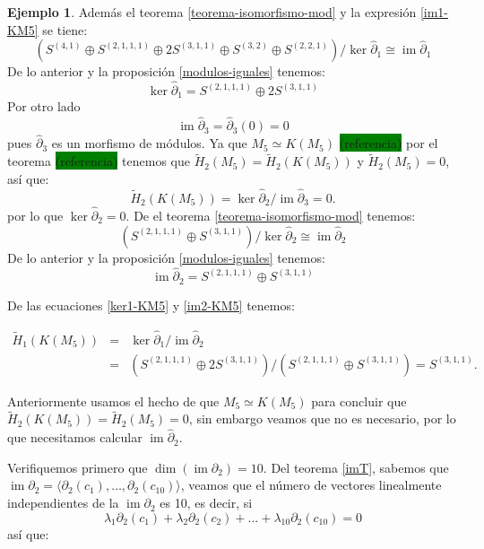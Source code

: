 \documentclass[12pt]{book}
\theoremstyle{definition}
\newtheorem{example}[theorem]{Ejemplo}
\DeclareMathOperator{\im}{im}
\newcounter{in}
\begin{document}
\begin{example}
Además el teorema \ref{teorema-isomorfismo-mod} y la expresión \ref{im1-KM5} se tiene:
$$(S^{(4,1)}\oplus S^{(2,1,1,1)}\oplus 2S^{(3,1,1)}\oplus S^{(3,2)}
\oplus S^{(2,2,1)})/\ker \widehat\partial_{1}\cong \im \widehat\partial_{1}$$
De lo anterior y la proposición \ref{modulos-iguales} tenemos:
\begin{equation}
\label{ker1-KM5}
\ker \widehat\partial_{1}=S^{(2,1,1,1)}\oplus 2S^{(3,1,1)}
\end{equation}
Por otro lado
\begin{equation*}
\im\widehat\partial_{3}=\widehat\partial_{3}(0)=0
\label{im3-KM5}
\end{equation*}
pues $\widehat\partial_{3}$ es un morfismo de módulos. Ya que $M_{5}\simeq K(M_{5})$
\setlength{\fboxsep}{0pt}\colorbox{green}{(referencia)} por el teorema
\setlength{\fboxsep}{0pt}\colorbox{green}{(referencia)} tenemos que
$\widetilde H_{2}(M_{5})=\widetilde H_{2}(K(M_{5}))$ y  $\widetilde H_{2}(M_{5})=0$, así que:
\begin{equation*}
\widetilde H_{2}(K(M_{5}))=\ker \widehat\partial_{2}/\im \widehat\partial_{3}=0.
\end{equation*}
por lo que $\ker \widehat\partial_{2}=0$. De el teorema
\ref{teorema-isomorfismo-mod} tenemos:
$$(S^{(2,1,1,1)}\oplus S^{(3,1,1)})/\ker \widehat\partial_{2}\cong \im
\widehat\partial_{2}$$
De lo anterior y la proposición \ref{modulos-iguales} tenemos:
\begin{equation}
\im \widehat\partial_{2}=S^{(2,1,1,1)}\oplus S^{(3,1,1)}
\label{im2-KM5}
\end{equation}

De las ecuaciones \ref{ker1-KM5} y \ref{im2-KM5} tenemos:

\begin{eqnarray*}
  \widetilde H_{1}(K(M_{5}))&=&\ker \widehat\partial_{1}/\im
  \widehat\partial_{2}\\
  &=&(S^{(2,1,1,1)}\oplus 2S^{(3,1,1)})/(S^{(2,1,1,1)}\oplus S^{(3,1,1)})=S^{(3,1,1)}.
\end{eqnarray*}

Anteriormente usamos el hecho de que $M_{5}\simeq K(M_{5})$  para
concluir que $\widetilde H_{2}(K(M_{5}))=\widetilde H_{2}(M_{5})=0$, sin embargo veamos que no es necesario, por lo que
necesitamos calcular $\im \widehat\partial_{2}$. 

Verifiquemos primero que $\dim(\im \partial_{2})=10$. Del teorema
\ref{imT}, sabemos que
$\im \partial_{2}=\langle\partial_{2}(c_{1}),\ldots,\partial_{2}(c_{10})\rangle$,
veamos que el número de vectores linealmente independientes de la
$\im \partial_{2}$ es 10, es
decir, si
$$\lambda_{1}\partial_{2}(c_{1})+\lambda_{2}\partial_{2}(c_{2})+\ldots+\lambda_{10}\partial_{2}(c_{10})=0$$
así que:


\end{example}
\end{document}
